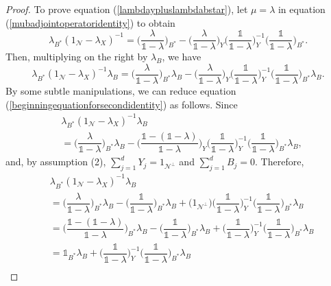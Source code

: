 \documentclass[11pt, reqno]{amsart}
\newcommand\1{\boldsymbol {1}}
\numberwithin{equation}{section}
\begin{document}
\begin{proof}
To prove equation (\ref{lambdaypluslambdabstar}), let $\mu=\lambda$ in equation (\ref{mubadjointoperatoridentity}) to obtain
$$ \lambda_{B^{*}}(1_{\mathcal{N}}-\lambda_{X})^{-1} = \bigg(\dfrac{\lambda}{\mathds{1}-\lambda}\bigg)_{B^{*}}- \bigg(\dfrac{\lambda}{\mathds{1}-\lambda}\bigg)_{Y}\bigg(\dfrac{\mathds{1}}{\mathds{1}-\lambda}\bigg)_{Y}^{-1}\bigg(\dfrac{\mathds{1}}{\mathds{1}-\lambda}\bigg)_{B^{*}}.$$
Then, multiplying on the right by $\lambda_{B}$, we have
\begin{equation}\label{beginningequationforsecondidentity}
\lambda_{B^{*}}(1_{\mathcal{N}}-\lambda_{X})^{-1}\lambda_{B} = \bigg(\dfrac{\lambda}{\mathds{1}-\lambda}\bigg)_{B^{*}}\lambda_{B}- \bigg(\dfrac{\lambda}{\mathds{1}-\lambda}\bigg)_{Y}\bigg(\dfrac{\mathds{1}}{\mathds{1}-\lambda}\bigg)_{Y}^{-1}\bigg(\dfrac{\mathds{1}}{\mathds{1}-\lambda}\bigg)_{B^{*}}\lambda_{B}.
\end{equation}
By some subtle manipulations, we can reduce equation (\ref{beginningequationforsecondidentity}) as follows. Since
\begin{align*}
    &\lambda_{B^{*}}(1_{\mathcal{N}}-\lambda_{X})^{-1}\lambda_{B} \\
    &= \bigg(\dfrac{\lambda}{\mathds{1}-\lambda}\bigg)_{B^{*}}\lambda_{B}- \bigg(\dfrac{\mathds{1}-(\mathds{1}-\lambda)}{\mathds{1}-\lambda}\bigg)_{Y}\bigg(\dfrac{\mathds{1}}{\mathds{1}-\lambda}\bigg)_{Y}^{-1}\bigg(\dfrac{\mathds{1}}{\mathds{1}-\lambda}\bigg)_{B^{*}}\lambda_{B}, 
\end{align*}
and, by assumption (2), $\sum_{j=1}^{d}Y_{j}=1_{\mathcal{N}^{\perp}}$ and $\sum_{j=1}^{d} B_{j}=0$. Therefore,
\begin{align}
&\lambda_{B^{*}}(1_{\mathcal{N}}-\lambda_{X})^{-1}\lambda_{B} \nonumber \\
&= \bigg(\dfrac{\lambda}{\mathds{1}-\lambda}\bigg)_{B^{*}}\lambda_{B} - \bigg(\dfrac{\mathds{1}}{\mathds{1}-\lambda}\bigg)_{B^{*}}\lambda_{B} + \Big(1_{\mathcal{N}^{\perp}}\Big)\bigg(\dfrac{\mathds{1}}{\mathds{1}-\lambda}\bigg)_{Y}^{-1}\bigg(\dfrac{\mathds{1}}{\mathds{1}-\lambda}\bigg)_{B^{*}}\lambda_{B} \nonumber \\
& = \bigg(\dfrac{\mathds{1}-(\mathds{1}-\lambda)}{\mathds{1}-\lambda}\bigg)_{B^{*}}\lambda_{B} - \bigg(\dfrac{\mathds{1}}{\mathds{1}-\lambda}\bigg)_{B^{*}}\lambda_{B} +\bigg(\dfrac{\mathds{1}}{\mathds{1}-\lambda}\bigg)_{Y}^{-1}\bigg(\dfrac{\mathds{1}}{\mathds{1}-\lambda}\bigg)_{B^{*}}\lambda_{B} \nonumber\\
& = \mathds{1}_{B^{*}}\lambda_{B} +\bigg(\dfrac{\mathds{1}}{\mathds{1}-\lambda}\bigg)_{Y}^{-1}\bigg(\dfrac{\mathds{1}}{\mathds{1}-\lambda}\bigg)_{B^{*}}\lambda_{B}\nonumber \\

\end{align}
\end{proof}
\end{document}

